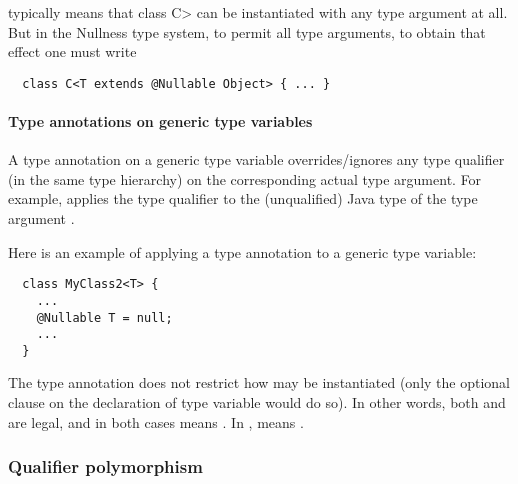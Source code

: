 typically means that class \<C> can be instantiated with any type argument at
all.  But in the Nullness type system, to permit all type arguments, to
obtain that effect one must write

\begin{Verbatim}
  class C<T extends @Nullable Object> { ... }
\end{Verbatim}


\paragraph{Type annotations on generic type variables}

A type annotation on a generic type variable overrides/ignores any type
qualifier (in the same type hierarchy) on the corresponding actual type
argument.  For example,
 applies the type qualifier  to the
(unqualified) Java type of the type argument .

Here is an example of applying a type annotation to a generic type
variable:

\begin{Verbatim}
  class MyClass2<T> {
    ...
    @Nullable T = null;
    ...
  }
\end{Verbatim}

\noindent
The type annotation does not restrict how  may be instantiated
(only the optional  clause on the declaration of type
variable  would do so).  In other words, both 
 and  are
legal, and in both cases  means .
In , 
 means .





\subsubsection{Qualifier polymorphism\label{qualifier-polymorphism}}

